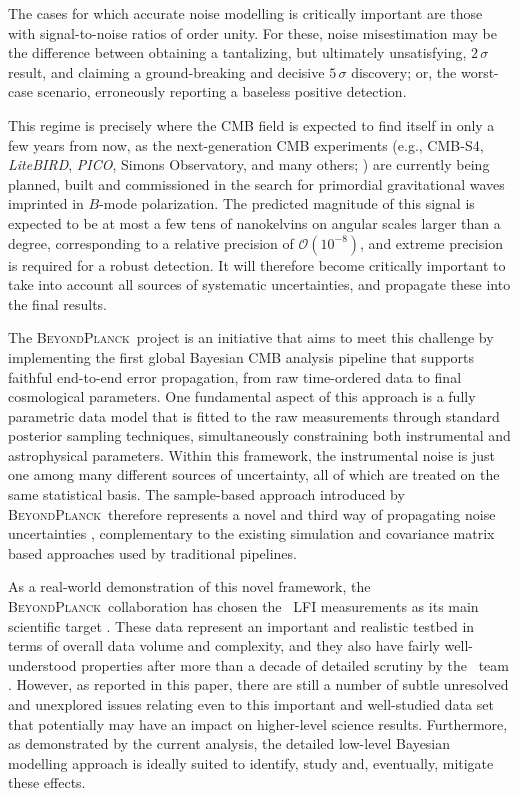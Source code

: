 \documentclass[twocolumn]{aa}
\newcommand{\BP}{\textsc{BeyondPlanck}}
\begin{document}
The cases for which accurate noise modelling is critically important
are those with signal-to-noise ratios of order unity. For these, noise
misestimation may be the difference between obtaining a tantalizing,
but ultimately unsatisfying, $2\,\sigma$ result, and claiming a
ground-breaking and decisive $5\,\sigma$ discovery; or, the
worst-case scenario, erroneously reporting a baseless positive
detection.

This regime is precisely where the CMB field is expected to find
itself in only a few years from now, as the next-generation CMB
experiments (e.g., CMB-S4, \textit{LiteBIRD}, \textit{PICO}, Simons Observatory, and
many others; \citealp{cmbS4,litebird2018,litebird2020,pico2019,SO2019}) are
currently being planned, built and commissioned in the search for
primordial gravitational waves imprinted in $B$-mode polarization. The
predicted magnitude of this signal is expected to be at most a few
tens of nanokelvins on angular scales larger than a degree,
corresponding to a relative precision of $\mathcal{O}(10^{-8})$, and
extreme precision is required for a robust detection. It will
therefore become critically important to take into account all sources
of systematic uncertainties, and propagate these into the final
results.

The \BP\ project \citep{bp01} is an initiative that aims to meet
this challenge by implementing the first global Bayesian CMB analysis
pipeline that supports faithful end-to-end error propagation, from raw
time-ordered data to final cosmological parameters. One fundamental
aspect of this approach is a fully parametric data model that is
fitted to the raw measurements through standard posterior sampling
techniques, simultaneously constraining both instrumental and
astrophysical parameters. Within this framework, the instrumental
noise is just one among many different sources of uncertainty, all of
which are treated on the same statistical basis. The sample-based
approach introduced by \BP\ therefore represents a novel and third way
of propagating noise uncertainties \citep{bp02,bp13}, complementary to the existing
simulation and covariance matrix based approaches used by traditional
pipelines.

As a real-world demonstration of this novel framework, the
\BP\ collaboration has chosen the \Planck\ LFI measurements
\citep{planck2016-l01,planck2016-l02} as its main scientific target
\citep{bp01}. These data represent an important and realistic testbed
in terms of overall data volume and complexity, and they also have
fairly well-understood properties after more than a decade of detailed
scrutiny by the \Planck\ team \citep[see][and references
  therein]{planck2013-p02,planck2014-a03,planck2016-l02}. However, as
reported in this paper, there are still a number of subtle unresolved
and unexplored issues relating even to this important and
well-studied data set that potentially may have an impact on
higher-level science results. Furthermore, as demonstrated by the
current analysis, the detailed low-level Bayesian modelling approach
is ideally suited to identify, study and, eventually, mitigate these
effects.
\end{document}
